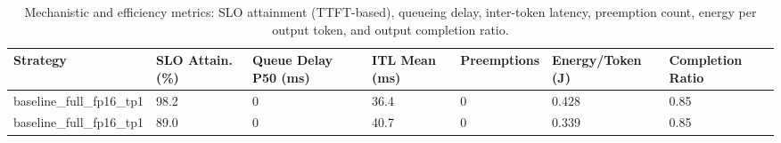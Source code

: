 \begin{table}
\caption{Mechanistic and efficiency metrics: SLO attainment (TTFT-based), queueing delay, inter-token latency, preemption count, energy per output token, and output completion ratio.}
\label{tab:efficiency}
\begin{tabular}{lllllll}
\toprule
Strategy & SLO Attain. (\%) & Queue Delay P50 (ms) & ITL Mean (ms) & Preemptions & Energy/Token (J) & Completion Ratio \\
\midrule
baseline\_full\_fp16\_tp1 & 98.2 & 0 & 36.4 & 0 & 0.428 & 0.85 \\
baseline\_full\_fp16\_tp1 & 89.0 & 0 & 40.7 & 0 & 0.339 & 0.85 \\
\bottomrule
\end{tabular}
\end{table}
